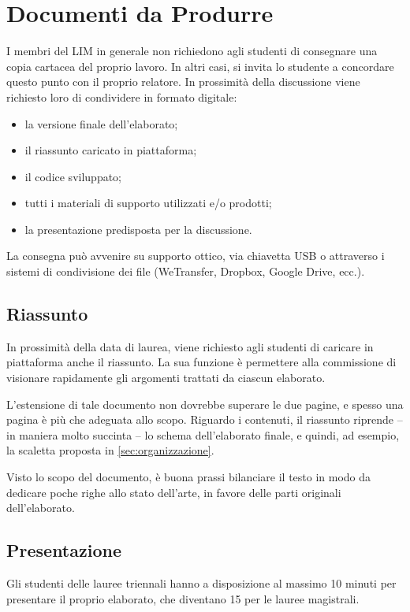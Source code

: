 \documentclass[12pt]{report}
\begin{document}
\chapter{Documenti da Produrre}
I membri del LIM in generale non richiedono agli studenti di consegnare una copia cartacea del proprio lavoro. In altri casi, si invita lo studente a concordare questo punto con il proprio relatore.
In prossimità della discussione viene richiesto loro di condividere in formato digitale:
\begin{itemize}
    \item la versione finale dell'elaborato;
    \item il riassunto caricato in piattaforma;
    \item il codice sviluppato;
    \item tutti i materiali di supporto utilizzati e/o prodotti;
    \item la presentazione predisposta per la discussione.
\end{itemize}

La consegna può avvenire su supporto ottico, via chiavetta USB o attraverso i sistemi di condivisione dei file (WeTransfer, Dropbox, Google Drive, ecc.).

\section{Riassunto}
In prossimità della data di laurea, viene richiesto agli studenti di caricare in piattaforma anche il riassunto. La sua funzione è permettere alla commissione di visionare rapidamente gli argomenti trattati da ciascun elaborato.

L'estensione di tale documento non dovrebbe superare le due pagine, e spesso una pagina è più che adeguata allo scopo. Riguardo i contenuti, il riassunto riprende -- in maniera molto succinta -- lo schema dell'elaborato finale, e quindi, ad esempio, la scaletta proposta in \ref{sec:organizzazione}.

Visto lo scopo del documento, è buona prassi bilanciare il testo in modo da dedicare poche righe allo stato dell'arte, in favore delle parti originali dell'elaborato.

\section{Presentazione}
Gli studenti delle lauree triennali hanno a disposizione al massimo 10 minuti per presentare il proprio elaborato, che diventano 15 per le lauree magistrali.
\end{document}
